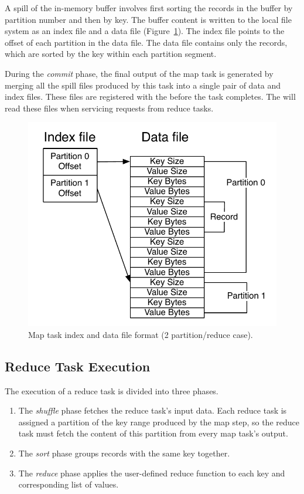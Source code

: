 A spill of the in-memory buffer involves first sorting the records in
the buffer by partition number and then by key. The buffer content is
written to the local file system as an index file and a data file
(Figure~\ref{fig:mapoutput}). The index file points to the offset of
each partition in the data file. The data file contains only the
records, which are sorted by the key within each partition segment.

During the \emph{commit} phase, the final output of the map task is generated by
merging all the spill files produced by this task into a single pair of data and
index files. These files are registered with the {\TT} before the task
completes. The \TT will read these files when servicing requests from reduce
tasks.

\begin{figure}[t]
  \centering
  \includegraphics[width=0.90\linewidth]{figures/spill_file.pdf}
  \vspace{-8pt}
  \caption{Map task index and data file format (2 partition/reduce case).}
  \label{fig:mapoutput}
\end{figure}

\subsection{Reduce Task Execution}
\label{sec:reducetask}
The execution of a reduce task is divided into three phases.
\begin{enumerate}
\item The \emph{shuffle} phase fetches the reduce task's input
  data. Each reduce task is assigned a partition of the key range
  produced by the map step, so the reduce task must fetch the content
  of this partition from every map task's output.
\item The \emph{sort} phase groups records with the same key together.
\item The \emph{reduce} phase applies the user-defined reduce function
  to each key and corresponding list of values.
\end{enumerate}

